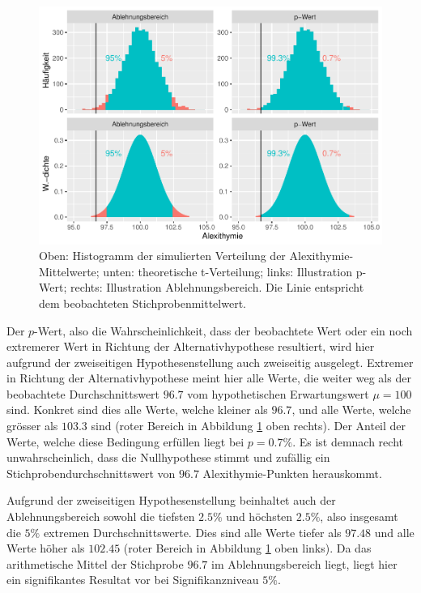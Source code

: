 \documentclass[
]{book}
\theoremstyle{definition}
\theoremstyle{definition}
\theoremstyle{definition}
\theoremstyle{definition}
\theoremstyle{remark}
\begin{document}
\begin{figure}
\centering
\includegraphics{aps_statistik1_files/figure-latex/exm-alexithymie-plot-1.pdf}
\caption{\label{fig:exm-alexithymie-plot}Oben: Histogramm der simulierten Verteilung der Alexithymie-Mittelwerte; unten: theoretische t-Verteilung; links: Illustration p-Wert; rechts: Illustration Ablehnungsbereich. Die Linie entspricht dem beobachteten Stichprobenmittelwert.}
\end{figure}

Der \(p\)-Wert, also die Wahrscheinlichkeit, dass der beobachtete Wert oder ein noch extremerer Wert in Richtung der Alternativhypothese resultiert, wird hier aufgrund der zweiseitigen Hypothesenstellung auch zweiseitig ausgelegt. Extremer in Richtung der Alternativhypothese meint hier alle Werte, die weiter weg als der beobachtete Durchschnittswert \(96.7\) vom hypothetischen Erwartungswert \(\mu = 100\) sind. Konkret sind dies alle Werte, welche kleiner als \(96.7\), und alle Werte, welche grösser als \(103.3\) sind (roter Bereich in Abbildung \ref{fig:exm-alexithymie-plot} oben rechts). Der Anteil der Werte, welche diese Bedingung erfüllen liegt bei \(p = 0.7\%\). Es ist demnach recht unwahrscheinlich, dass die Nullhypothese stimmt und zufällig ein Stichprobendurchschnittswert von \(96.7\) Alexithymie-Punkten herauskommt.

Aufgrund der zweiseitigen Hypothesenstellung beinhaltet auch der Ablehnungsbereich sowohl die tiefsten \(2.5\%\) und höchsten \(2.5\%\), also insgesamt die \(5\%\) extremen Durchschnittswerte. Dies sind alle Werte tiefer als \(97.48\) und alle Werte höher als \(102.45\) (roter Bereich in Abbildung \ref{fig:exm-alexithymie-plot} oben links). Da das arithmetische Mittel der Stichprobe \(96.7\) im Ablehnungsbereich liegt, liegt hier ein signifikantes Resultat vor bei Signifikanzniveau \(5\%\).
\end{document}
